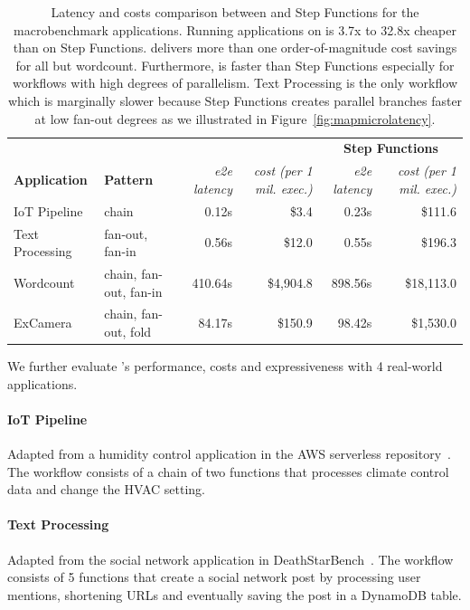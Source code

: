 \begin{table}[t]
\centering
\begin{tabular}{ll|rr|rr}
\hline
                     &                        & \multicolumn{2}{c}{\textbf{\name{}}}            & \multicolumn{2}{c}{\textbf{Step Functions}}       \\
\textbf{Application} & \textbf{Pattern}       & \textit{e2e latency} & \textit{cost (per 1 mil. exec.)}   & \textit{e2e latency} & \textit{cost (per 1 mil. exec.)}            \\ \hline
IoT Pipeline         & chain                  & 0.12s              & \$3.4      & 0.23s       & \$111.6    \\
Text Processing      & fan-out, fan-in        & 0.56s             & \$12.0      & 0.55s        & \$196.3   \\
Wordcount            & chain, fan-out, fan-in & 410.64s                 & \$4,904.8   & 898.56s                 & \$18,113.0 \\
ExCamera             & chain, fan-out, fold   & 84.17s                  & \$150.9 & 98.42s                  & \$1,530.0      \\ \hline
\end{tabular}
\caption{Latency and costs comparison between \name{} and Step Functions for
the macrobenchmark applications. Running applications on \name{} is 3.7x to
32.8x cheaper than on Step Functions. \name{} delivers more than one
order-of-magnitude cost savings for all but wordcount. Furthermore, \name{} is
faster than Step Functions especially for workflows with high degrees of
parallelism. Text Processing is the only workflow which \name{} is marginally
slower because Step Functions creates parallel branches faster at low fan-out
degrees as we illustrated in Figure~\ref{fig:mapmicrolatency}.}
\label{table:macro}
\end{table}

We further evaluate \name{}'s performance, costs and expressiveness with 4
real-world applications. 

\paragraph{IoT Pipeline} Adapted from a humidity control application in the
AWS serverless repository~\cite{iot-pipeline}. The workflow consists of a
chain of two functions that processes climate control data and change the HVAC
setting.

\paragraph{Text Processing} Adapted from the social network application in
DeathStarBench~\cite{deathstar}. The workflow consists of 5 functions that
create a social network post by processing user mentions, shortening URLs and
eventually saving the post in a DynamoDB table.

